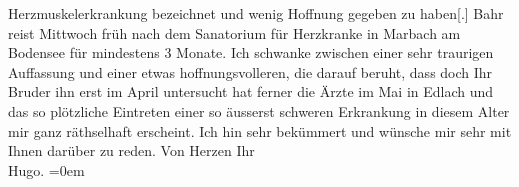 \begin{ledgroupsized}[t]{13cm}
               Herzmuskelerkrankung {\pb}bezeichnet
               und wenig Hoffnung gegeben zu haben{[}.{]}\pend
           \pstart
           Bahr reist Mittwoch früh nach dem Sanatorium für Herzkranke in Marbach am Bodensee
               für mindestens 3 Monate. Ich schwanke zwischen einer sehr traurigen Auffassung und
               einer etwas hoffnungsvolleren, die darauf beruht, dass doch Ihr Bruder ihn {\pb}erst im April
               untersucht hat ferner die Ärzte im Mai in Edlach und das so plötzliche Eintreten einer so äusserst schweren Erkrankung
               in diesem Alter mir ganz räthselhaft erscheint.\pend
           \pstart
           Ich hin sehr bekümmert und wünsche mir sehr mit Ihnen darüber zu reden. Von
               Herzen Ihr{\\[\baselineskip]}\spacefill\mbox{Hugo.}\pend
           \leftskip=0em{}
         
         \endnumbering{}\end{ledgroupsized}  \newcommand{\dateiname}{L01361}\newcommand{\titel}{Hugo von Hofmannsthal an Arthur Schnitzler, [8. – 9. 1. 1904]}\newcommand{\editorInnen}{ Martin Anton Müller und Gerd-Hermann Susen}
      
